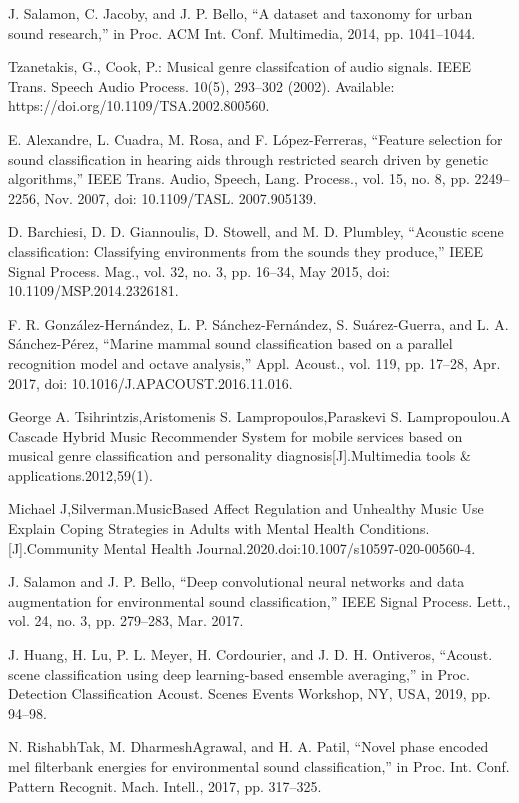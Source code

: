 \documentclass[runningheads]{llncs}
\begin{document}
\begin{thebibliography}{8}
\bibitem{}J. Salamon, C. Jacoby, and J. P. Bello, “A dataset and taxonomy for urban sound research,” in Proc. ACM Int. Conf. Multimedia, 2014, pp. 1041–1044.

\bibitem{}Tzanetakis, G., Cook, P.: Musical genre classifcation of audio signals. IEEE Trans. Speech Audio Process. 10(5), 293–302 (2002). Available: https://doi.org/10.1109/TSA.2002.800560.

\bibitem{}E. Alexandre, L. Cuadra, M. Rosa, and F. López-Ferreras, “Feature selection for sound classification in hearing aids through restricted search driven by genetic algorithms,” IEEE Trans. Audio, Speech, Lang. Process., vol. 15, no. 8, pp. 2249–2256, Nov. 2007, doi: 10.1109/TASL. 2007.905139.

\bibitem{}D. Barchiesi, D. D. Giannoulis, D. Stowell, and M. D. Plumbley, “Acoustic scene classification: Classifying environments from the sounds they produce,” IEEE Signal Process. Mag., vol. 32, no. 3, pp. 16–34, May 2015, doi: 10.1109/MSP.2014.2326181.

\bibitem{}F. R. González-Hernández, L. P. Sánchez-Fernández, S. Suárez-Guerra, and L. A. Sánchez-Pérez, “Marine mammal sound classification based on a parallel recognition model and octave analysis,” Appl. Acoust., vol. 119, pp. 17–28, Apr. 2017, doi: 10.1016/J.APACOUST.2016.11.016.

\bibitem{}George A. Tsihrintzis,Aristomenis S. Lampropoulos,Paraskevi S. Lampropoulou.A Cascade    Hybrid Music Recommender System for mobile services based on musical genre classification and personality diagnosis[J].Multimedia tools \& applications.2012,59(1).

\bibitem{}Michael J,Silverman.MusicBased Affect Regulation and Unhealthy Music Use Explain Coping Strategies in Adults with Mental Health Conditions.[J].Community Mental Health Journal.2020.doi:10.1007/s10597-020-00560-4.

\bibitem{}J. Salamon and J. P. Bello, “Deep convolutional neural networks and data augmentation for environmental sound classification,” IEEE Signal Process. Lett., vol. 24, no. 3, pp. 279–283, Mar. 2017.

\bibitem{}J. Huang, H. Lu, P. L. Meyer, H. Cordourier, and J. D. H. Ontiveros, “Acoust. scene classification using deep learning-based ensemble averaging,” in Proc. Detection Classification Acoust. Scenes Events Workshop, NY, USA, 2019, pp. 94–98.

\bibitem{}N. RishabhTak, M. DharmeshAgrawal, and H. A. Patil, “Novel phase encoded mel filterbank energies for environmental sound classification,” in Proc. Int. Conf. Pattern Recognit. Mach. Intell., 2017, pp. 317–325.


\end{thebibliography}
\end{document}
